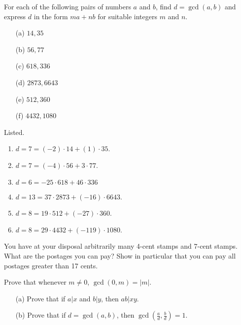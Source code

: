   \begin{exercise}[Shifrin 1.2.1]
    For each of the following pairs of numbers $a$ and $b$, find $d = \gcd(a,b)$ and express $d$ in the form $ma+nb$ for suitable integers $m$ and $n$.
    \begin{enumerate}
      \item[(a)] $14, 35$
      \item[(b)] $56, 77$
      \item[(c)] $618, 336$
      \item[(d)] $2873, 6643$
      \item[(e)] $512, 360$
      \item[(f)] $4432, 1080$
    \end{enumerate}
  \end{exercise}
  \begin{solution}
    Listed. 
    \begin{enumerate}
      \item $d = 7 = (-2) \cdot 14 + (1) \cdot 35$. 
      \item $d = 7 = (-4) \cdot 56 + 3 \cdot 77$. 
      \item $d = 6 = -25 \cdot 618 + 46 \cdot 336$ 
      \item $d = 13 = 37 \cdot 2873 + (-16) \cdot 6643$. 
      \item $d = 8 = 19 \cdot 512 + (-27) \cdot 360$. 
      \item $d = 8 = 29 \cdot 4432 + (-119) \cdot 1080$. 
    \end{enumerate}
  \end{solution}

  \begin{exercise}[Shifrin 1.2.2]
    You have at your disposal arbitrarily many 4-cent stamps and 7-cent stamps. What are the postages you can pay? Show in particular that you can pay all postages greater than 17 cents.
  \end{exercise}
  \begin{solution}
    
  \end{solution}

  \begin{exercise}[Shifrin 1.2.3]
    Prove that whenever $m \neq 0$, $\gcd(0, m) = |m|$.
  \end{exercise}
  \begin{solution}
    
  \end{solution}

  \begin{exercise}[Shifrin 1.2.4]
    \begin{enumerate}
      \item[(a)] Prove that if $a|x$ and $b|y$, then $ab|xy$.
      \item[(b)] Prove that if $d = \gcd(a, b)$, then $\gcd(\frac{a}{d}, \frac{b}{d}) = 1$.
    \end{enumerate}
  \end{exercise}
  \begin{solution}
    
  \end{solution}

